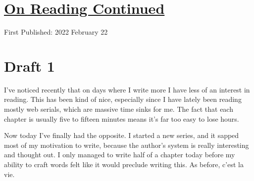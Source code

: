 \documentclass[12pt]{article}[titlepage]
\newcommand{\1}{\={a}}
\newcommand{\2}{\={e}}
\newcommand{\3}{\={\i}}
\newcommand{\4}{\=o}
\newcommand{\5}{\=u}
\newcommand{\6}{\={A}}
\renewcommand{\,}{\textsuperscript{,}}
\begin{document}
\doublespacing
\section{\href{reading-2.html}{On Reading Continued}}
First Published: 2022 February 22

\section{Draft 1}
I've noticed recently that on days where I write more I have less of an interest in reading.
This has been kind of nice, especially since I have lately been reading mostly web serials, which are massive time sinks for me.
The fact that each chapter is usually five to fifteen minutes means it's far too easy to lose hours.

Now today I've finally had the opposite.
I started a new series, and it sapped most of my motivation to write, because the author's system is really interesting and thought out.
I only managed to write half of a chapter today before my ability to craft words felt like it would preclude writing this.
As before, c'est la vie.
\end{document}
